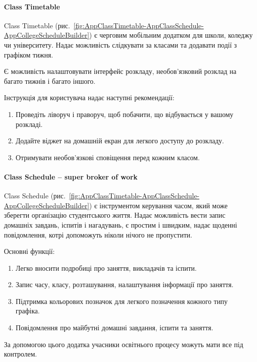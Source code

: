 \paragraph{Class Timetable}

Class Timetable (рис.~\ref{fig:AppClassTimetable-AppClassSchedule-AppCollegeScheduleBuilder}) є черговим мобільним додатком для школи, коледжу чи університету. Надає можливість слідкувати за класами та додавати події з графіком тижня.

Є можливість налаштовувати інтерфейс розкладу, необов'язковий розклад на багато тижнів і багато іншого. 

Інструкція для користувача надає наступні рекомендації:

\begin{enumerate}
    \item Проведіть ліворуч і праворуч, щоб побачити, що відбувається у вашому розкладі.
    \item Додайте віджет на домашній екран для легкого доступу до розкладу.
    \item Отримувати необов'язкові сповіщення перед кожним класом.
\end{enumerate}

\paragraph{Class Schedule – super broker of work}

Class Schedule (рис.~\ref{fig:AppClassTimetable-AppClassSchedule-AppCollegeScheduleBuilder}) є інструментом керування часом, який може зберегти організацію  студентського життя. Надає можливість вести запис домашніх завдань, іспитів і нагадувань, є простим і швидким, надає щоденні повідомлення, котрі допоможуть ніколи нічого не пропустити.

Основні функції:
\begin{enumerate}
    \item Легко вносити подробиці про заняття, викладачів та іспити.
    \item Запис часу, класу, розташування, налаштування інформації про заняття.
    \item Підтримка кольорових позначок для легкого позначення кожного типу графіка.
    \item Повідомлення про майбутні домашні завдання, іспити та заняття.
\end{enumerate}

За допомогою цього додатка учасники освітнього процесу можуть мати все під контролем.


